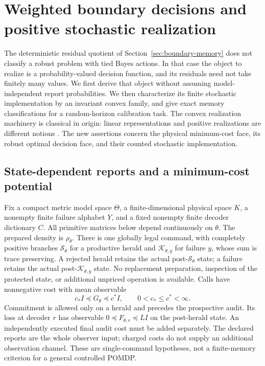 \section{Weighted boundary decisions and positive stochastic realization}\label{sec:robust-realization}
The deterministic residual quotient of Section~\ref{sec:boundary-memory} does not classify a robust problem with tied Bayes actions. In that case the object to realize is a probability-valued decision function, and its residuals need not take finitely many values. We first derive that object without assuming model-independent report probabilities. We then characterize its finite stochastic implementation by an invariant convex family, and give exact memory classifications for a random-horizon calibration task. The convex realization machinery is classical in origin: linear representations and positive realizations are different notions \cite{Jaeger00,ThonJaeger15,MonrasWinter14}. The new assertions concern the physical minimum-cost face, its robust optimal decision face, and their counted stochastic implementation.

\subsection{State-dependent reports and a minimum-cost potential}
Fix a compact metric model space $\Theta$, a finite-dimensional physical space $K$, a nonempty finite failure alphabet $Y$, and a fixed nonempty finite decoder dictionary $C$. All primitive matrices below depend continuously on $\theta$. The prepared density is $\rho_\theta$. There is one globally legal command, with completely positive branches $\mathcal S_\theta$ for a productive herald and $\mathcal K_{\theta,y}$ for failure $y$, whose sum is trace preserving. A rejected herald retains the actual post-$\mathcal S_\theta$ state; a failure retains the actual post-$\mathcal K_{\theta,y}$ state. No replacement preparation, inspection of the protected state, or additional unpriced operation is available. Calls have nonnegative cost with mean observable
\[
 c_* I\preccurlyeq G_\theta\preccurlyeq c^*I,\qquad 0<c_*\le c^*<\infty.
\]
Commitment is allowed only on a herald and precedes the prospective audit. Its loss at decoder $r$ has observable $0\preccurlyeq F_{\theta,r}\preccurlyeq LI$ on the post-herald state. An independently executed final audit cost must be added separately. The declared reports are the whole observer input; charged costs do not supply an additional observation channel. These are single-command hypotheses, not a finite-memory criterion for a general controlled POMDP.


